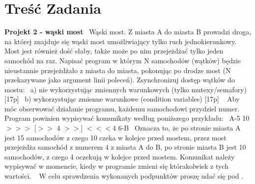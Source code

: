 \chapter{Treść Zadania}
\hypertarget{page1}{}\label{page1}
{\bfseries{Projekt 2 -\/ wąski most}}~\newline
 Wąski most. Z miasta A do miasta B prowadzi droga, na której znajduje się wąski most umożliwiający tylko ruch jednokierunkowy. Most jest również dość słaby, także może po nim przejeżdżać tylko jeden samochód na raz. Napisać program w którym N samochodów (wątków) będzie nieustannie przejeżdżało z miasta do miasta, pokonując po drodze most (N przekazywane jako argument linii poleceń). Zsynchronizuj dostęp wątków do mostu\+:~\newline
 a) nie wykorzystując zmiennych warunkowych (tylko mutexy/semafory) \mbox{[}17p\mbox{]}~\newline
 b) wykorzystując zmienne warunkowe (condition variables) \mbox{[}17p\mbox{]} ~\newline
 Aby móc obserwować działanie programu, każdemu samochodowi przydziel numer. Program powinien wypisywać komunikaty według poniższego przykładu\+:~\newline
 A-\/5 10\texorpdfstring{$>$}{>}\texorpdfstring{$>$}{>}\texorpdfstring{$>$}{>} \mbox{[}\texorpdfstring{$>$}{>}\texorpdfstring{$>$}{>} 4 \texorpdfstring{$>$}{>}\texorpdfstring{$>$}{>}\mbox{]} \texorpdfstring{$<$}{<}\texorpdfstring{$<$}{<}\texorpdfstring{$<$}{<}4 6-\/B~\newline
 Oznacza to, że po stronie miasta A jest 15 samochodów z czego 10 czeka w kolejce przed mostem, przez most przejeżdża samochód z numerem 4 z miasta A do B, po stronie miasta B jest 10 samochodów, z czego 4 oczekują w kolejce przed mostem. Komunikat należy wypisywać w momencie, kiedy w programie zmieni się którakolwiek z tych wartości. ~\newline
 W celu sprawdzenia wykonanych podpunktów proszę udać się pod . 